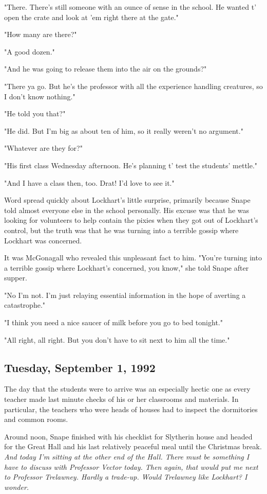 "There. There's still someone with an ounce of sense in the school. He wanted t' open the crate and look at 'em right there at the gate."

"How many are there?"

"A good dozen."

"And he was going to release them into the air on the grounds?"

"There ya go. But he's the professor with all the experience handling creatures, so I don't know nothing."

"He told you that?"

"He did. But I'm big as about ten of him, so it really weren't no argument."

"Whatever are they for?"

"His first class Wednesday afternoon. He's planning t' test the students' mettle."

"And I have a class then, too. Drat! I'd love to see it."

Word spread quickly about Lockhart's little surprise, primarily because Snape told almost everyone else in the school personally. His excuse was that he was looking for volunteers to help contain the pixies when they got out of Lockhart's control, but the truth was that he was turning into a terrible gossip where Lockhart was concerned.

It was McGonagall who revealed this unpleasant fact to him. "You're turning into a terrible gossip where Lockhart's concerned, you know," she told Snape after supper.

"No I'm not. I'm just relaying essential information in the hope of averting a catastrophe."

"I think you need a nice saucer of milk before you go to bed tonight."

"All right, all right. But you don't have to sit next to him all the time."

\sbreak

\subsection{Tuesday, September 1, 1992}

The day that the students were to arrive was an especially hectic one as every teacher made last minute checks of his or her classrooms and materials. In particular, the teachers who were heads of houses had to inspect the dormitories and common rooms.

Around noon, Snape finished with his checklist for Slytherin house and headed for the Great Hall and his last relatively peaceful meal until the Christmas break. \emph{And today I'm sitting at the other end of the Hall. There must be something I have to discuss with Professor Vector today. Then again, that would put me next to Professor Trelawney. Hardly a trade-up. Would Trelawney like Lockhart? I wonder.}

